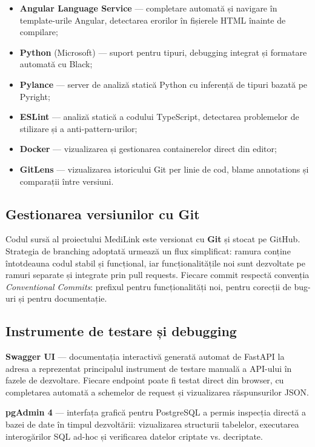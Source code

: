 \begin{itemize}
  \item \textbf{Angular Language Service} --- completare automată și navigare în template-urile Angular, detectarea erorilor în fișierele HTML înainte de compilare;
  \item \textbf{Python} (Microsoft) --- suport pentru tipuri, debugging integrat și formatare automată cu Black;
  \item \textbf{Pylance} --- server de analiză statică Python cu inferență de tipuri bazată pe Pyright;
  \item \textbf{ESLint} --- analiză statică a codului TypeScript, detectarea problemelor de stilizare și a anti-pattern-urilor;
  \item \textbf{Docker} --- vizualizarea și gestionarea containerelor direct din editor;
  \item \textbf{GitLens} --- vizualizarea istoricului Git per linie de cod, blame annotations și comparații între versiuni.
\end{itemize}

\subsection{Gestionarea versiunilor cu Git}

Codul sursă al proiectului MediLink este versionat cu \textbf{Git} și stocat pe GitHub. Strategia de branching adoptată urmează un flux simplificat: ramura  conține întotdeauna codul stabil și funcțional, iar funcționalitățile noi sunt dezvoltate pe ramuri separate și integrate prin pull requests. Fiecare commit respectă convenția \textit{Conventional Commits}: prefixul  pentru funcționalități noi,  pentru corecții de bug-uri și  pentru documentație.

\subsection{Instrumente de testare și debugging}

\textbf{Swagger UI} --- documentația interactivă generată automat de FastAPI la adresa  a reprezentat principalul instrument de testare manuală a API-ului în fazele de dezvoltare. Fiecare endpoint poate fi testat direct din browser, cu completarea automată a schemelor de request și vizualizarea răspunsurilor JSON.

\textbf{pgAdmin 4} --- interfața grafică pentru PostgreSQL a permis inspecția directă a bazei de date în timpul dezvoltării: vizualizarea structurii tabelelor, executarea interogărilor SQL ad-hoc și verificarea datelor criptate vs. decriptate.

